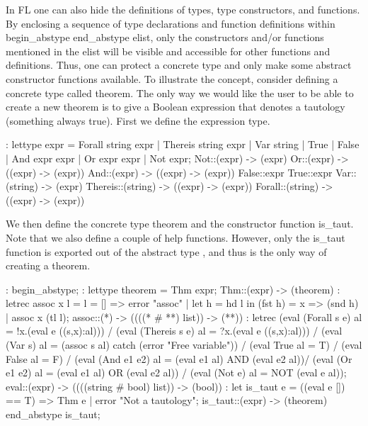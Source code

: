 In FL one can also hide the definitions of types, type constructors,
and functions. By
enclosing a sequence of type declarations and function definitions
within begin\_abstype%
%
{}
end\_abstype%
%
{} elist, only the constructors and/or functions mentioned
in the elist will be visible
and accessible for other functions and definitions. Thus, one can protect
a concrete type and only
make some abstract constructor functions available. To illustrate the
concept, consider defining a
concrete type called theorem. The only way we would like the user to
be able to create a new theorem is to give a Boolean expression that
denotes a tautology (something always true).
First we define the expression type.
\begin{hol}
: lettype expr =  Forall string expr |
                Thereis string expr |
                Var string |
                True |
                False |
                And expr expr |
                Or expr expr |
                Not expr;
Not::(expr) -> (expr)
Or::(expr) -> ((expr) -> (expr))
And::(expr) -> ((expr) -> (expr))
False::expr
True::expr
Var::(string) -> (expr)
Thereis::(string) -> ((expr) -> (expr))
Forall::(string) -> ((expr) -> (expr))
\end{hol}

We then define the concrete type theorem and the constructor function
is\_taut. Note that we
also define a couple of help functions. However, only the is\_taut function
is exported out of the
abstract type%
%
{}, and thus is the only way of creating a theorem.
\begin{hol}
: begin\_abstype;
: lettype theorem = Thm expr;
Thm::(expr) -> (theorem)
: letrec assoc x l = l = [] => error "assoc" |
                let h = hd l in
                (fst h) = x => (snd h) | assoc x (tl l);
assoc::(*) -> ((((* # **) list)) -> (**))
: letrec  (eval (Forall s e) al = !x.(eval e ((s,x):al))) /\verb@\@
        (eval (Thereis s e) al = ?x.(eval e ((s,x):al))) /\verb@\@
        (eval (Var s) al = (assoc s al) catch
                                   (error "Free variable")) /\verb@\@
        (eval True al = T) /\verb@\@
        (eval False al = F) /\verb@\@
        (eval (And e1 e2) al = (eval e1 al) AND (eval e2 al))/\verb@\@
        (eval (Or e1 e2) al = (eval e1 al) OR (eval e2 al)) /\verb@\@
        (eval (Not e) al = NOT (eval e al));
eval::(expr) -> ((((string # bool) list)) -> (bool))
: let is\_taut e = ((eval e []) == T) => Thm e |
                                       error "Not a tautology";
is\_taut::(expr) -> (theorem)
end\_abstype is\_taut;
\end{hol}

